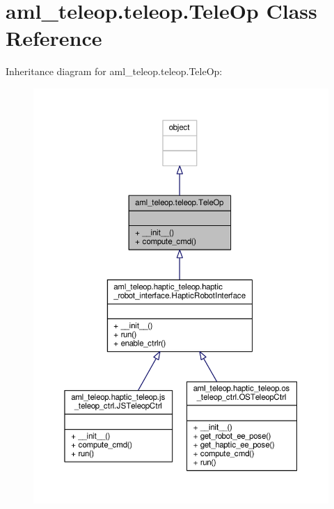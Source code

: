 \hypertarget{classaml__teleop_1_1teleop_1_1_tele_op}{\section{aml\-\_\-teleop.\-teleop.\-Tele\-Op Class Reference}
\label{classaml__teleop_1_1teleop_1_1_tele_op}
}


Inheritance diagram for aml\-\_\-teleop.\-teleop.\-Tele\-Op\-:
\nopagebreak
\begin{figure}[H]
\begin{center}
\leavevmode
\includegraphics[width=350pt]{classaml__teleop_1_1teleop_1_1_tele_op__inherit__graph}
\end{center}
\end{figure}


